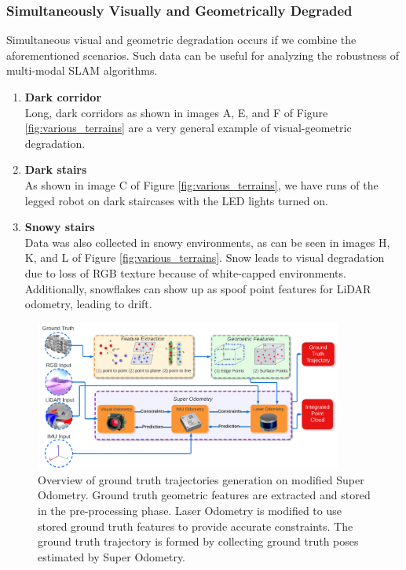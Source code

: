 \documentclass[10pt,twocolumn,letterpaper]{article}
\begin{document}
\subsubsection{Simultaneously Visually and Geometrically Degraded}
Simultaneous visual and geometric degradation occurs if we combine the aforementioned scenarios. Such data can be useful for analyzing the robustness of multi-modal SLAM algorithms.
\begin{enumerate}[label=(\alph*)]
    \item \textbf{Dark corridor} \\
    Long, dark corridors as shown in images A, E, and F of Figure \ref{fig:various_terrains} are a very general example of visual-geometric degradation.
    \item \textbf{Dark stairs} \\
    As shown in image C of Figure \ref{fig:various_terrains}, we have runs of the legged robot on dark staircases with the LED lights turned on.
    \item \textbf{Snowy stairs} \\
    Data was also collected in snowy environments, as can be seen in images H, K, and L of Figure \ref{fig:various_terrains}. Snow leads to visual degradation due to loss of RGB texture because of white-capped environments. Additionally, snowflakes can show up as spoof point features for LiDAR odometry, leading to drift.
\end{enumerate}






\begin{figure}[ht!]
    \centering
    \includegraphics[width=0.9\textwidth,height=\textheight,keepaspectratio]{figure/localization_demo_10.png}
    \caption{Overview of ground truth trajectories generation on modified Super Odometry. Ground truth geometric features are extracted and stored in the pre-processing phase. Laser Odometry is modified to use stored ground truth features to provide accurate constraints. The ground truth trajectory is formed by collecting ground truth poses estimated by Super Odometry.}
    \label{fig:localization}
\end{figure}
\end{document}
